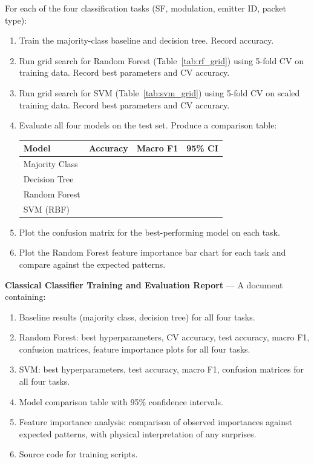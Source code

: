 \documentclass[11pt,letterpaper]{article}
\begin{document}
	\begin{tcolorbox}[infobox={Exercise: Classical Classifier Comparison}]
		For each of the four classification tasks (SF, modulation, emitter ID, packet type):
		\begin{enumerate}
			\item Train the majority-class baseline and decision tree. Record accuracy.
			\item Run grid search for Random Forest (Table~\ref{tab:rf_grid}) using 5-fold CV on training data. Record best parameters and CV accuracy.
			\item Run grid search for SVM (Table~\ref{tab:svm_grid}) using 5-fold CV on scaled training data. Record best parameters and CV accuracy.
			\item Evaluate all four models on the test set. Produce a comparison table:

			\medskip
			\begin{tabular}{l c c c}
				\toprule
				\textbf{Model} & \textbf{Accuracy} & \textbf{Macro F1} & \textbf{95\% CI} \\
				\midrule
				Majority Class & & & \\
				Decision Tree & & & \\
				Random Forest & & & \\
				SVM (RBF) & & & \\
				\bottomrule
			\end{tabular}

			\item Plot the confusion matrix for the best-performing model on each task.
			\item Plot the Random Forest feature importance bar chart for each task and compare against the expected patterns.
		\end{enumerate}
	\end{tcolorbox}

	\begin{tcolorbox}[deliverable={Session 14 Deliverable}]
		\textbf{Classical Classifier Training and Evaluation Report} --- A document containing:
		\begin{enumerate}
			\item Baseline results (majority class, decision tree) for all four tasks.
			\item Random Forest: best hyperparameters, CV accuracy, test accuracy, macro F1, confusion matrices, feature importance plots for all four tasks.
			\item SVM: best hyperparameters, test accuracy, macro F1, confusion matrices for all four tasks.
			\item Model comparison table with 95\% confidence intervals.
			\item Feature importance analysis: comparison of observed importances against expected patterns, with physical interpretation of any surprises.
			\item Source code for training scripts.
		\end{enumerate}
	\end{tcolorbox}
\end{document}
